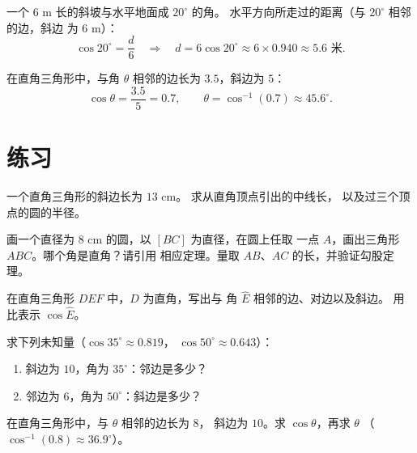 \begin{example}[求边长]\label{ex:g8:cosine:side}
一个 $6$ m 长的斜坡与水平地面成 $20^\circ$ 的角。
水平方向所走过的距离（与 $20^\circ$ 相邻的边，斜边
为 $6$ m）：
\[
\cos 20^\circ = \frac{d}{6}
\quad\Longrightarrow\quad
d = 6 \cos 20^\circ \approx 6 \times 0.940 \approx 5.6 \text{ 米}.
\]
\end{example}

\begin{example}[求角]\label{ex:g8:cosine:angle}
在直角三角形中，与角 $\theta$ 相邻的边长为
$3.5$，斜边为 $5$：
\[
\cos\theta = \frac{3.5}{5} = 0.7,
\qquad
\theta = \cos^{-1}(0.7) \approx 45.6^\circ .
\]
\end{example}

\section{练习}

\begin{exercise}[$\star$]\label{exo:g8:cosine:1}
一个直角三角形的斜边长为 $13$ cm。
求从直角顶点引出的中线长，
以及过三个顶点的圆的半径。
\end{exercise}

\begin{exercise}[$\star$]\label{exo:g8:cosine:2}
画一个直径为 $8$ cm 的圆，以 $[BC]$ 为直径，在圆上任取
一点 $A$，画出三角形 $ABC$。哪个角是直角？请引用
相应定理。量取 $AB$、$AC$ 的长，并验证勾股定理。
\end{exercise}

\begin{exercise}[$\star$]\label{exo:g8:cosine:3}
在直角三角形 $DEF$ 中，$D$ 为直角，写出与
角 $\widehat E$ 相邻的边、对边以及斜边。
用比表示 $\cos \widehat E$。
\end{exercise}

\begin{exercise}[$\star$]\label{exo:g8:cosine:4}
求下列未知量（$\cos 35^\circ \approx 0.819$，
$\cos 50^\circ \approx 0.643$）：
\begin{enumerate}
  \item 斜边为 $10$，角为 $35^\circ$：邻边是多少？
  \item 邻边为 $6$，角为 $50^\circ$：斜边是多少？
\end{enumerate}
\end{exercise}

\begin{exercise}[$\star$]\label{exo:g8:cosine:5}
在直角三角形中，与 $\theta$ 相邻的边长为 $8$，
斜边为 $10$。求 $\cos\theta$，再求 $\theta$
（$\cos^{-1}(0.8) \approx 36.9^\circ$）。
\end{exercise}


